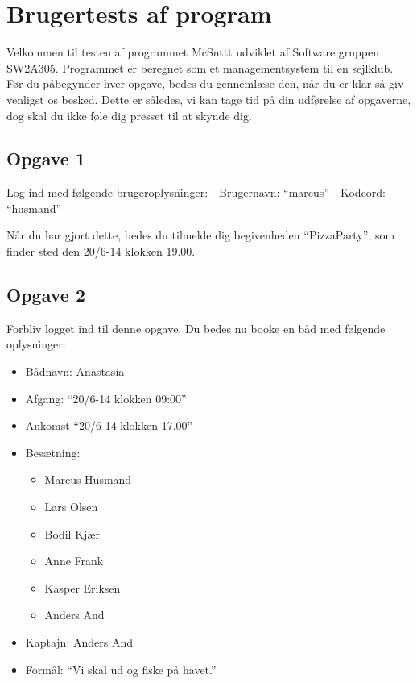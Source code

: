 \chapter{Brugertests af program}\label{BrugerTestCases}


Velkommen til testen af programmet McSnttt udviklet af Software gruppen SW2A305.
Programmet er beregnet som et managementsystem til en sejlklub.
Før du påbegynder hver opgave, bedes du gennemlæse den, når du er klar så giv venligst os besked.
Dette er således, vi kan tage tid på din udførelse af opgaverne, dog skal du ikke føle dig presset til at skynde dig.

\section{Opgave 1}

Log ind med følgende brugeroplysninger: 
\newline - Brugernavn: ``marcus''
\newline - Kodeord: ``husmand''

Når du har gjort dette, bedes du tilmelde dig begivenheden ``PizzaParty'', som finder sted den 20/6-14 klokken 19.00.

\section{Opgave 2}

Forbliv logget ind til denne opgave. Du bedes nu booke en båd med følgende oplysninger:

\begin{itemize}
	\item Bådnavn: Anastasia
	\item Afgang: ``20/6-14 klokken 09:00''
	\item Ankomst ``20/6-14 klokken 17.00''
	\item Besætning: 
	\begin{itemize}
		\item Marcus Husmand
		\item Lars Olsen
		\item Bodil Kjær
		\item Anne Frank
		\item Kasper Eriksen
		\item Anders And
	\end{itemize}
	\item Kaptajn: Anders And
	\item Formål: ``Vi skal ud og fiske på havet.''

\end{itemize}

